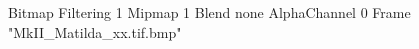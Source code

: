 {Bitmap
	{Filtering 1}
	{Mipmap 1}
	{Blend none}
	{AlphaChannel 0}
	{Frame "MkII_Matilda_xx.tif.bmp"}
}
